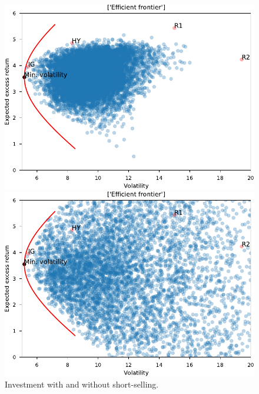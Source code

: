\documentclass[11pt,a4paper,oneside]{article}
\begin{document}
\begin{figure}[!tbp]
\label{plot:efficientFrontier}
\caption{Investment with and without short-selling.}
\centering
  \vspace{4mm}
  \begin{minipage}[b]{0.4\textwidth}
    \includegraphics[scale=0.6]{images/efFrontier.pdf}
  \end{minipage}
  \begin{minipage}[b]{0.4\textwidth}
    \includegraphics[scale=0.6]{images/efFrontierShort.pdf}
  \end{minipage}
\begingroup
\vspace{4mm}
\endgroup
\end{figure}
\end{document}
